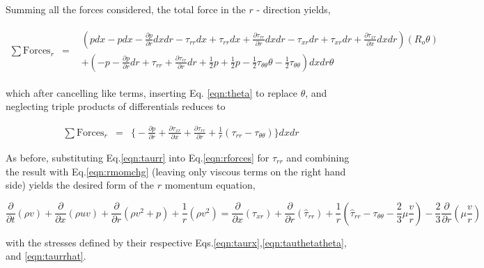	Summing all the forces considered, the total force in the $r$ - direction yields,

\begin{displaymath}
	\begin{array}{ccc}
	\sum \textrm{Forces}_r & = &
		\begin{array}{c}
			(pdx - pdx  - \frac{\partial p}{\partial r}dxdr - \tau_{rr}dx + \tau_{rr}dx + 
			\frac{\partial \tau_{rr}}{\partial r}dxdr - \tau_{xr}dr + \tau_{xr}dr 
			 + \frac{\partial \tau_{xr}}{\partial x} dxdr)
			(R_o \theta) \\
			+ (-p -\frac{\partial p}{\partial r}dr + \tau_{rr} + \frac{\partial \tau_{rr}}{\partial r}dr
			+ \frac{1}{2}p + \frac{1}{2}p - \frac{1}{2}\tau_{\theta \theta} \theta 
			- \frac{1}{2}\tau_{\theta \theta}) dxdr\theta
		\end{array}
	\end{array}
\end{displaymath}

	which after cancelling like terms, inserting Eq. \ref{eqn:theta} to replace $\theta$, and neglecting 
triple products of differentials reduces to

\begin{equation}
	\begin{array}{ccc}
	\sum \textrm{Forces}_r & = &
		\Big\{- \frac{\partial p}{\partial r} + \frac{\partial \tau_{xr}}{\partial x}
		+ \frac{\partial \tau_{rr}}{\partial r} + \frac{1}{r}(\tau_{rr} - \tau_{\theta \theta})\Big\}dxdr
	\end{array}
\label{eqn:rforces}
\end{equation}

	As before, substituting Eq.\ref{eqn:taurr} into Eq.\ref{eqn:rforces} for $\tau_{rr}$ and combining
the result with Eq.\ref{eqn:rmomchg} (leaving only viscous terms on the right hand side) yields the desired form
of the $r$ momentum equation,

\begin{equation}
\frac{\partial}{\partial t}(\rho v) + \frac{\partial}{\partial x}(\rho uv) +
\frac{\partial}{\partial r}(\rho v^2 + p) + \frac{1}{r}(\rho v^2) = 
\frac{\partial}{\partial x}(\tau_{xr}) + \frac{\partial}{\partial r}(\hat{\tau}_{rr}) + 
\frac{1}{r}(\hat{\tau}_{rr} - \tau_{\theta \theta} - \frac{2}{3} \mu \frac{v}{r})
- \frac{2}{3} \frac{\partial}{\partial r}(\mu \frac{v}{r})
\label{eqn:rmom}
\end{equation}

	with the stresses defined by their respective Eqs.\ref{eqn:taurx},\ref{eqn:tauthetatheta}, and \ref{eqn:taurrhat}.

